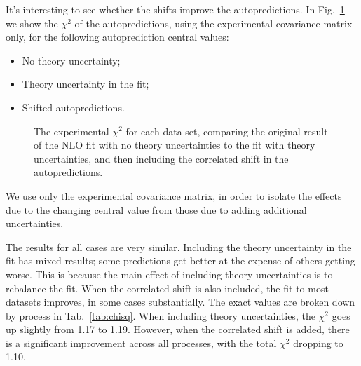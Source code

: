 It's interesting to see whether the shifts improve the autopredictions. In Fig.~\ref{fig:chi2auto} we show the $\chi^2$ of the autopredictions, using the experimental covariance matrix only, for the following autoprediction central values:
\begin{itemize}
\item No theory uncertainty;
\item Theory uncertainty in the fit;
\item Shifted autopredictions.
\end{itemize}
\begin{figure}[H]
    \begin{center}
    \end{center}
  \vspace{-0.55cm}
  \caption{The experimental $\chi^2$ for each data set, comparing the original result of the NLO fit with no theory uncertainties to the fit with theory uncertainties, and then including the correlated shift in the autopredictions.}
  \label{fig:chi2auto}
\end{figure}
We use only the experimental covariance matrix, in order to isolate the effects due to the changing central value from those due to adding additional uncertainties. 

The results for all cases are very similar. Including the theory uncertainty in the fit has mixed results; some predictions get better at the expense of others getting worse. This is because the main effect of including theory uncertainties is to rebalance the fit. When the correlated shift is also included, the fit to most datasets improves, in some cases substantially. The exact values are broken down by process in Tab.~\ref{tab:chisq}. When including theory uncertainties, the $\chi^2$ goes up slightly from 1.17 to 1.19. However, when the correlated shift is added, there is a significant improvement across all processes, with the total $\chi^2$ dropping to 1.10.


